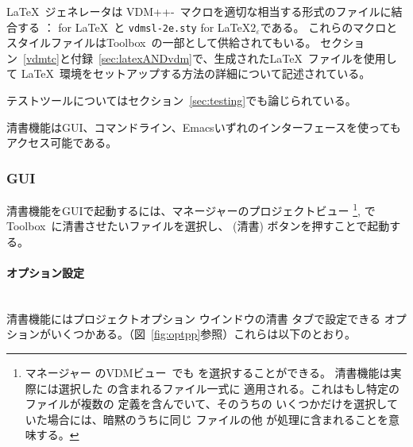 \documentclass[\pformat,12pt]{jarticle}
\newcommand{\Toolbox}{Toolbox}
\DeclareRobustCommand{\VdmSlPp}{VDM++-\VdmSl}
\newcommand{\vdmModView}{\guicmd{VDMビュー}}
\newcommand{\subsubsubsection}[1]{\paragraph{#1}\mbox{}\\}
\newcommand{\guicmd}[1]{{\gt #1}}
\begin{document}
\LaTeX\ ジェネレータは \VdmSlPp\ マクロを適切な相当する形式のファイルに結合する
： for \LaTeX\ と 
{\tt vdmsl-2e.sty} for \LaTeX$2_{\varepsilon}$である。
これらのマクロとスタイルファイルは\Toolbox\ の一部として供給されてもいる。
セクション~\ref{vdmtc}と付録~\ref{sec:latexANDvdm}で、生成された\LaTeX\ ファイルを使用して
\LaTeX\ 環境をセットアップする方法の詳細について記述されている。

テストツールについてはセクション~\ref{sec:testing}でも論じられている。

清書機能はGUI、コマンドライン、Emacsいずれのインターフェースを使ってもアクセス可能である。

\subsubsection{GUI}


清書機能をGUIで起動するには、\guicmd{マネージャー}の\guicmd{プロジェクトビュー} %
\footnote{%
  \guicmd{マネージャー} の\vdmModView\ でも
  を選択することができる。
  清書機能は実際には選択した
  の含まれるファイル一式に
  適用される。これはもし特定のファイルが複数の
   定義を含んでいて、そのうちの
  いくつかだけを選択していた場合には、暗黙のうちに同じ
  ファイルの他  が処理に含まれることを意味する。
},%
で\Toolbox\ に清書させたいファイルを選択し、 
(\guicmd{清書}) ボタンを押すことで起動する。

\subsubsubsection{オプション設定}

清書機能には\guicmd{プロジェクトオプション} ウインドウの\guicmd{清書} タブで設定できる
オプションがいくつかある。（図~\ref{fig:optpp}参照）これらは以下のとおり。
\end{document}
